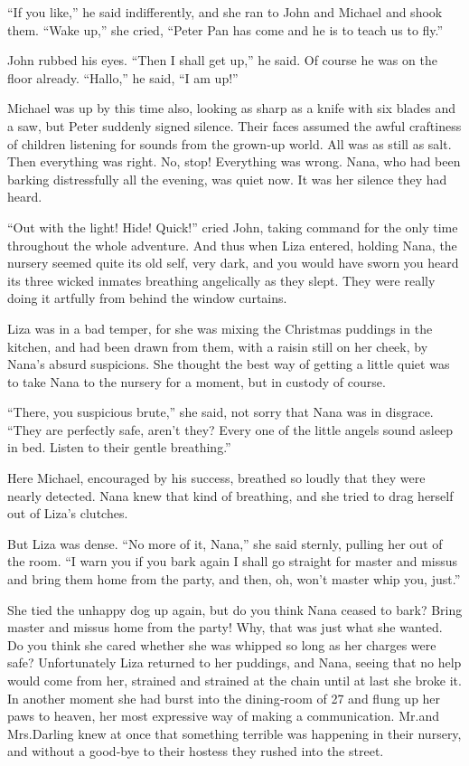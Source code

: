 “If you like,” he said indifferently, and she ran to John and Michael and shook them.
“Wake up,” she cried, “Peter Pan has come and he is to teach us to fly.”

John rubbed his eyes.
“Then I shall get up,” he said.
Of course he was on the floor already.
“Hallo,” he said, “I am up!”

Michael was up by this time also, looking as sharp as a knife with six blades and a saw,
but Peter suddenly signed silence.
Their faces assumed the awful craftiness of children listening for sounds from the grown‐up world.
All was as still as salt.
Then everything was right.
No, stop!
Everything was wrong.
Nana, who had been barking distressfully all the evening, was quiet now.
It was her silence they had heard.

“Out with the light!
Hide!
Quick!\@” cried John, taking command for the only time throughout the whole adventure.
And thus when Liza entered, holding Nana, the nursery seemed quite its old self, very dark,
and you would have sworn you heard its three wicked inmates breathing angelically as they slept.
They were really doing it artfully from behind the window curtains.

Liza was in a bad temper, for she was mixing the Christmas puddings in the kitchen,
and had been drawn from them, with a raisin still on her cheek, by Nana’s absurd suspicions.
She thought the best way of getting a little quiet was to take Nana to the nursery for a moment,
but in custody of course.

“There, you suspicious brute,” she said, not sorry that Nana was in disgrace.
“They are perfectly safe, aren’t they?
Every one of the little angels sound asleep in bed.
Listen to their gentle breathing.”

Here Michael, encouraged by his success, breathed so loudly that they were nearly detected.
Nana knew that kind of breathing, and she tried to drag herself out of Liza’s clutches.

But Liza was dense.
“No more of it, Nana,” she said sternly, pulling her out of the room.
“I warn you if you bark again I shall go straight for master and missus and bring them home from the party,
and then, oh, won’t master whip you, just.”

She tied the unhappy dog up again, but do you think Nana ceased to bark?
Bring master and missus home from the party!
Why, that was just what she wanted.
Do you think she cared whether she was whipped so long as her charges were safe?
Unfortunately Liza returned to her puddings,
and Nana, seeing that no help would come from her, strained and strained at the chain until at last she broke it.
In another moment she had burst into the dining‐room of 27 and flung up her paws to heaven,
her most expressive way of making a communication.
Mr.\@ and Mrs.\@ Darling knew at once that something terrible was happening in their nursery,
and without a good‐bye to their hostess they rushed into the street.

